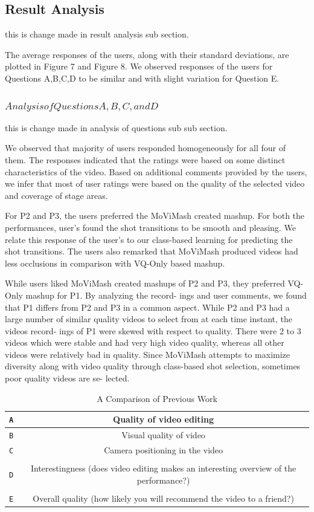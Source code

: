\documentclass{new}
\begin{document}
\subsection{Result Analysis}
this is change made in result analysis sub section.

The average responses of the users, along with their standard
deviations, are plotted in Figure 7 and Figure 8. We observed responses of the users for Questions A,B,C,D to be similar and with
slight variation for Question E.

\subsubsection{$Analysis of Questions A, B, C, and D$}
this is change made in analysis of questions sub sub section.

We observed that majority of users responded homogeneously
for all four of them. The responses indicated that the ratings were
based on some distinct characteristics of the video. Based on additional comments provided by the users, we infer that most of user ratings were based on the quality of the selected video and coverage
of stage areas.

For P2 and P3, the users preferred the MoViMash created mashup.
For both the performances, user's found the shot transitions to be
smooth and pleasing. We relate this response of the user’s to our
class-based learning for predicting the shot transitions. The users
also remarked that MoViMash produced videos had less occlusions
in comparison with VQ-Only based mashup.

While users liked MoViMash created mashups of P2 and P3,
they preferred VQ-Only mashup for P1. By analyzing the record-
ings and user comments, we found that P1 differs from P2 and P3 in
a common aspect. While P2 and P3 had a large number of similar
quality videos to select from at each time instant, the videos record-
ings of P1 were skewed with respect to quality. There were 2 to 3
videos which were stable and had very high video quality, whereas
all other videos were relatively bad in quality. Since MoViMash
attempts to maximize diversity along with video quality through
class-based shot selection, sometimes poor quality videos are se-
lected.
\begin{table}
\centering
\caption{A Comparison of Previous Work}
\begin{tabular*}{\columnwidth}{c{1cm}|c{7cm}} \hline
\texttt A&Quality of video editing  \\ \hline
\texttt B&Visual quality of video  \\ \hline
\texttt C&Camera positioning in the video  \\ \hline\\
\texttt D&Interestingness (does video editing makes an interesting
overview of the performance?)  \\ \hline\\
\texttt E&Overall quality (how likely you will recommend the video to
a friend?)  \\ \hline
\end{tabular*}
\end{table}
\end{document}
